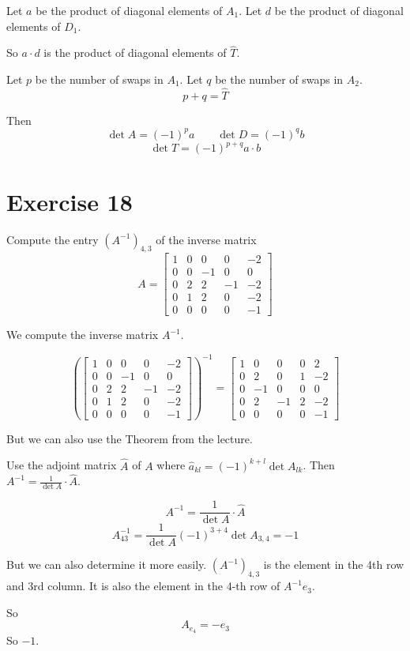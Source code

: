 \documentclass[a4paper]{article}
\theoremstyle{definition}
\begin{document}
Let $a$ be the product of diagonal elements of $A_1$.
Let $d$ be the product of diagonal elements of $D_1$.

So $a \cdot d$ is the product of diagonal elements of $\hat T$.

Let $p$ be the number of swaps in $A_1$. Let $q$ be the number of swaps in $A_2$.
\[ p + q = \hat{T} \]

Then
\[ \det{A} = (-1)^p a \qquad \det{D} = (-1)^q b \]
\[ \det{T} = (-1)^{p+q} a \cdot b \]

\section{Exercise 18}
\begin{ex}
  Compute the entry $(A^{-1})_{4,3}$ of the inverse matrix
  \[
    A = \begin{bmatrix}
      1 & 0 & 0 & 0 & -2 \\
      0 & 0 & -1 & 0 & 0 \\
      0 & 2 & 2 & -1 & -2 \\
      0 & 1 & 2 & 0 & -2 \\
      0 & 0 & 0 & 0 & -1
    \end{bmatrix}
  \]
\end{ex}

We compute the inverse matrix $A^{-1}$.

\[
  \left(\begin{bmatrix}
    1 & 0 & 0 & 0 & -2 \\
    0 & 0 & -1 & 0 & 0 \\
    0 & 2 & 2 & -1 & -2 \\
    0 & 1 & 2 & 0 & -2 \\
    0 & 0 & 0 & 0 & -1
  \end{bmatrix}\right)^{-1}
  =
  \begin{bmatrix}
    1 & 0 & 0 & 0 & 2 \\
    0 & 2 & 0 & 1 & -2 \\
    0 & -1 & 0 & 0 & 0 \\
    0 & 2 & -1 & 2 & -2 \\
    0 & 0 & 0 & 0 & -1
  \end{bmatrix}
\]

But we can also use the Theorem from the lecture.

Use the adjoint matrix $\hat{A}$ of $A$ where $\hat{a}_{kl} = (-1)^{k+l} \det{A_{lk}}$.
Then $A^{-1} = \frac{1}{\det{A}} \cdot \hat{A}$.

\[ A^{-1} = \frac{1}{\det{A}} \cdot \hat{A} \]
\[ A^{-1}_{43} = \frac{1}{\det{A}} (-1)^{3+4} \det{A_{3,4}} = -1 \]

But we can also determine it more easily.
$(A^{-1})_{4,3}$ is the element in the 4th row and 3rd column.
It is also the element in the $4$-th row of $A^{-1} e_3$.

So
\[ A_{e_4} = -e_3 \]
So $-1$.
\end{document}
